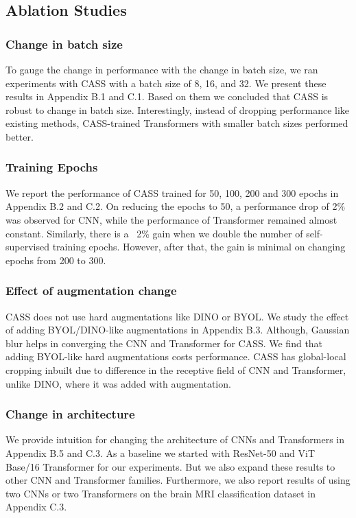 \subsection{Ablation Studies}

\subsubsection{Change in batch size}
To gauge the change in performance with the change in batch size, we ran experiments with CASS with a batch size of 8, 16, and 32. We present these results in Appendix B.1 and C.1. Based on them we concluded that CASS is robust to change in batch size. Interestingly, instead of dropping performance like existing methods, CASS-trained Transformers with smaller batch sizes performed better. 

\subsubsection{Training Epochs} We report the performance of CASS trained for 50, 100, 200 and 300 epochs in Appendix B.2 and C.2. On reducing the epochs to 50, a performance drop of 2\% was observed for CNN, while the performance of Transformer remained almost constant. Similarly, there is a ~2\% gain when we double the number of self-supervised training epochs. However, after that, the gain is minimal on changing epochs from 200 to 300. 

\subsubsection{Effect of augmentation change} CASS does not use hard augmentations like DINO or BYOL.
We study the effect of adding BYOL/DINO-like augmentations in Appendix B.3. Although, Gaussian blur helps in converging the CNN and Transformer for CASS. We find that adding BYOL-like hard augmentations costs performance. CASS has global-local cropping inbuilt due to difference in the receptive field of CNN and Transformer, unlike DINO, where it was added with augmentation. 

\subsubsection{Change in architecture} We provide intuition for changing the architecture of CNNs and Transformers in Appendix B.5 and C.3. As a baseline we started with ResNet-50 and ViT Base/16 Transformer for our experiments. But we also expand these results to other CNN and Transformer families. Furthermore, we also report results of using two CNNs or two Transformers on the brain MRI classification dataset in Appendix C.3.

